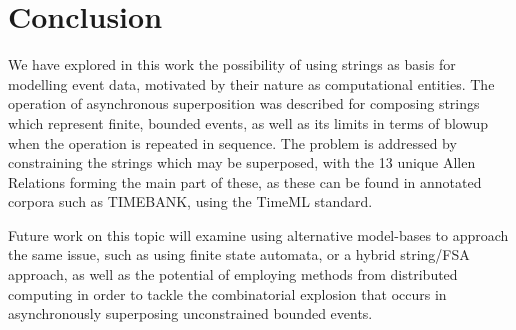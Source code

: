 \documentclass[a4paper,11pt]{article}
\begin{document}
\section{Conclusion}\label{conclusion}
We have explored in this work the possibility of using strings as basis for 
modelling event data, motivated by their nature as computational entities. The 
operation of asynchronous superposition was described for composing strings 
which represent finite, bounded events, as well as its limits in terms of 
blowup when the operation is repeated in sequence. The problem is addressed by 
constraining the strings which may be superposed, with the 13 unique 
Allen Relations forming the main part of these, as these can be found in 
annotated corpora such as TIMEBANK, using the TimeML standard.

Future work on this topic will examine using alternative model-bases to 
approach the same issue, such as using finite state automata, or a hybrid 
string/FSA approach, as well as the potential of employing methods from 
distributed computing in order to tackle the combinatorial explosion that 
occurs in asynchronously superposing unconstrained bounded events.
{}

\end{document}
